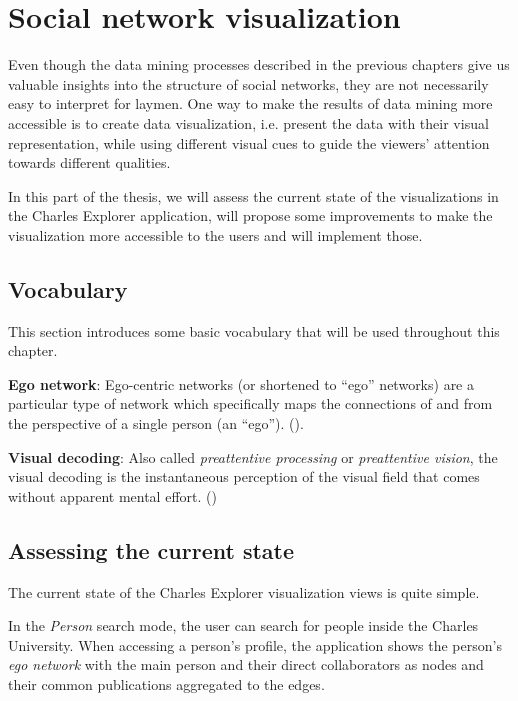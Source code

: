 \chapter{Social network visualization}

Even though the data mining processes described in the previous chapters give us valuable insights into the structure of social networks, 
they are not necessarily easy to interpret for laymen.
One way to make the results of data mining more accessible is to create data visualization, i.e. present the data with their visual representation, 
while using different visual cues to guide the viewers' attention towards different qualities.

In this part of the thesis, we will assess the current state of the visualizations in the Charles Explorer application, 
will propose some improvements to make the visualization more accessible to the users and will implement those.

\section{Vocabulary}

This section introduces some basic vocabulary that will be used throughout this chapter.

\textbf{Ego network}: Ego-centric networks (or shortened to “ego” networks) are a particular type of network which specifically maps the connections of and from the perspective of a single person (an “ego”). (\cite{Lizardo2020-xo}).

\textbf{Visual decoding}: Also called \textit{preattentive processing} or \textit{preattentive vision}, the visual decoding is the instantaneous perception of the visual field that comes without apparent mental effort. (\cite{Cleveland1985})

\section{Assessing the current state}

The current state of the Charles Explorer visualization views is quite simple. 

In the \textit{Person} search mode, the user can search for people inside the Charles University. 
When accessing a person's profile, the application shows the person's \textit{ego network} with the main person and their direct collaborators 
as nodes and their common publications aggregated to the edges.

